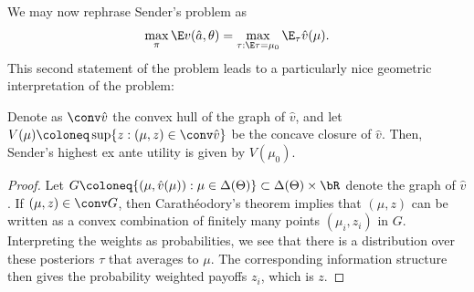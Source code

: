 We may now rephrase Sender's problem as
\[
  \max_{\pi} \E v(\hat{a}, \theta)
  = \max_{\tau: \E \tau = \mu_0} \E_\tau \hat{v}(\mu).
\]
This second statement of the problem leads to a particularly nice geometric interpretation of the problem:
\begin{proposition}
  Denote as \(\conv \hat{v}\) the convex hull of the graph of \(\hat{v}\), and let \(V(\mu) \coloneq \sup \{z: (\mu, z) \in \conv \hat{v}\}\) be the concave closure of \(\hat{v}\).
  Then, Sender's highest ex ante utility is given by \(V(\mu_0)\).
\end{proposition}
\begin{proof}
  Let \(G \coloneq \{(\mu, \hat{v}(\mu)): \mu \in \Delta(\Theta)\} \subset \Delta(\Theta) \times \bR\) denote the graph of \(\hat{v}\).
  If \((\mu, z) \in \conv G\), then Carathéodory's theorem implies that \((\mu, z)\) can be written as a convex combination of finitely many points \((\mu_i, z_i)\) in \(G\).
  Interpreting the weights as probabilities, we see that there is a distribution over these posteriors \(\tau\) that averages to \(\mu\).
  The corresponding information structure then gives the probability weighted payoffs \(z_i\), which is \(z\).
\end{proof}

